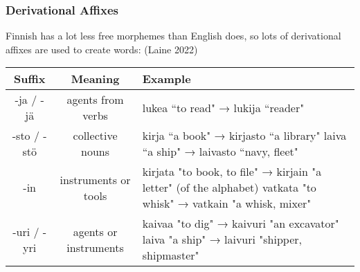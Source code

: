 \documentclass{beamer}
\begin{document}
\begin{frame}
	\frametitle{Derivational Affixes}
        Finnish has a lot less free morphemes than English does, so lots of derivational affixes are used to create words: (Laine 2022)
    {\scriptsize
    \begin{center}
        \begin{tabular}{|c|c|p{5cm}|}
            \hline
            \textbf{Suffix} & \textbf{Meaning} & \textbf{Example}\\\hline
            -ja / -j\"a & 
                agents from verbs & 
                lukea ``to read" → lukija ``reader" \\\hline
            -sto / -stö & collective nouns & 
                kirja ``a book" → kirjasto ``a library" \newline 
                laiva ``a ship" → laivasto ``navy, fleet"\\\hline
            -in & 
                instruments or tools & 
                kirjata "to book, to file" → kirjain "a letter" (of the alphabet) \newline
                vatkata "to whisk" → vatkain "a whisk, mixer" \\\hline
            -uri / -yri & 
                agents or instruments &
                kaivaa "to dig" → kaivuri "an excavator" \newline
                laiva "a ship" → laivuri "shipper, shipmaster" \\\hline
        \end{tabular}
    \end{center}
    }
\end{frame}
\end{document}
